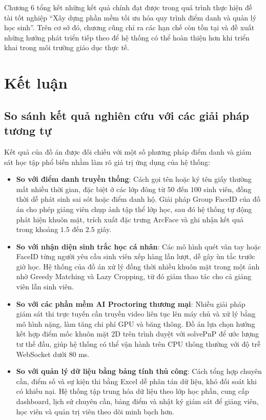 \documentclass[../DoAn.tex]{subfiles}
\begin{document}
Chương 6 tổng kết những kết quả chính đạt được trong quá trình thực hiện đề tài tốt nghiệp ``Xây dựng phần mềm tối ưu hóa quy trình điểm danh và quản lý học sinh''. Trên cơ sở đó, chương cũng chỉ ra các hạn chế còn tồn tại và đề xuất những hướng phát triển tiếp theo để hệ thống có thể hoàn thiện hơn khi triển khai trong môi trường giáo dục thực tế.

\section{Kết luận}
\label{section:6.1}

\subsection{So sánh kết quả nghiên cứu với các giải pháp tương tự}
Kết quả của đồ án được đối chiếu với một số phương pháp điểm danh và giám sát học tập phổ biến nhằm làm rõ giá trị ứng dụng của hệ thống:
\begin{itemize}
    \item \textbf{So với điểm danh truyền thống}: Cách gọi tên hoặc ký tên giấy thường mất nhiều thời gian, đặc biệt ở các lớp đông từ $50$ đến $100$ sinh viên, đồng thời dễ phát sinh sai sót hoặc điểm danh hộ. Giải pháp Group FaceID của đồ án cho phép giảng viên chụp ảnh tập thể lớp học, sau đó hệ thống tự động phát hiện khuôn mặt, trích xuất đặc trưng ArcFace \cite{Deng_2019_CVPR} và ghi nhận kết quả trong khoảng $1.5$ đến $2.5$ giây.
    \item \textbf{So với nhận diện sinh trắc học cá nhân}: Các mô hình quét vân tay hoặc FaceID từng người yêu cầu sinh viên xếp hàng lần lượt, dễ gây ùn tắc trước giờ học. Hệ thống của đồ án xử lý đồng thời nhiều khuôn mặt trong một ảnh nhờ Greedy Matching và Lazy Cropping, từ đó giảm thao tác cho cả giảng viên lẫn sinh viên.
    \item \textbf{So với các phần mềm AI Proctoring thương mại}: Nhiều giải pháp giám sát thi trực tuyến cần truyền video liên tục lên máy chủ và xử lý bằng mô hình nặng, làm tăng chi phí GPU và băng thông. Đồ án lựa chọn hướng kết hợp điểm mốc khuôn mặt 2D trên trình duyệt với solvePnP để ước lượng tư thế đầu, giúp hệ thống có thể vận hành trên CPU thông thường với độ trễ WebSocket dưới $80$ ms.
    \item \textbf{So với quản lý dữ liệu bằng bảng tính thủ công}: Cách tổng hợp chuyên cần, điểm số và sự kiện thi bằng Excel dễ phân tán dữ liệu, khó đối soát khi có khiếu nại. Hệ thống tập trung hóa dữ liệu theo lớp học phần, cung cấp dashboard, lịch sử chuyên cần, bảng điểm và nhật ký giám sát để giảng viên, học viên và quản trị viên theo dõi minh bạch hơn.
\end{itemize}
\end{document}
